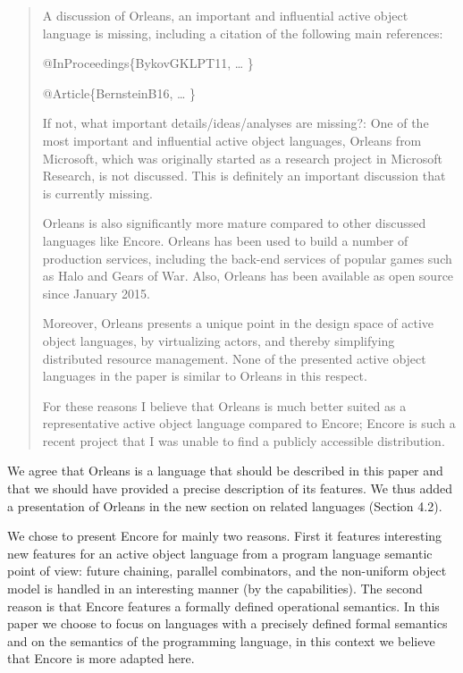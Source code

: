 \documentclass{article}
\begin{document}
\begin{quote}
	 A discussion of Orleans, an important and 
influential active object language is missing, including a citation of the following main 
references:

@InProceedings\{BykovGKLPT11,
\ldots
\}

@Article\{BernsteinB16,
\ldots
\}


If not, what important details/ideas/analyses are missing?: One of the most important and 
influential active object languages, Orleans from Microsoft, which was originally started 
as a research project in Microsoft Research, is not discussed. This is definitely an 
important discussion that is currently missing.

Orleans is also significantly more mature compared to other discussed languages like 
Encore. Orleans has been used to build a number of production services, including the 
back-end services of popular games such as Halo and Gears of War. Also, Orleans has been 
available as open source since January 2015.

Moreover, Orleans presents a unique point in the design space of active object languages, 
by virtualizing actors, and thereby simplifying distributed resource management. None of 
the presented active object languages in the paper is similar to Orleans in this respect.

For these reasons I believe that Orleans is much better suited as a representative active 
object language compared to Encore; Encore is such a recent project that I was unable to 
find a publicly accessible distribution.

\end{quote}
We agree that Orleans is a language that should be described in this paper and that we 
should have provided a precise description of its features.
We thus added a presentation of Orleans in the new section on related languages 
(Section 4.2).

We chose to present Encore for mainly two reasons. First it 
features interesting new features for an active object language from a program language 
semantic point of view: future chaining, parallel combinators, and the 
non-uniform object model is handled in an interesting manner (by the capabilities). The 
second reason is that 
Encore features a formally defined operational semantics. 
In this paper we choose to focus on languages with a precisely defined formal semantics 
and on the  semantics of the programming language, in this context we believe 
that Encore is more adapted here. 
\end{document}
